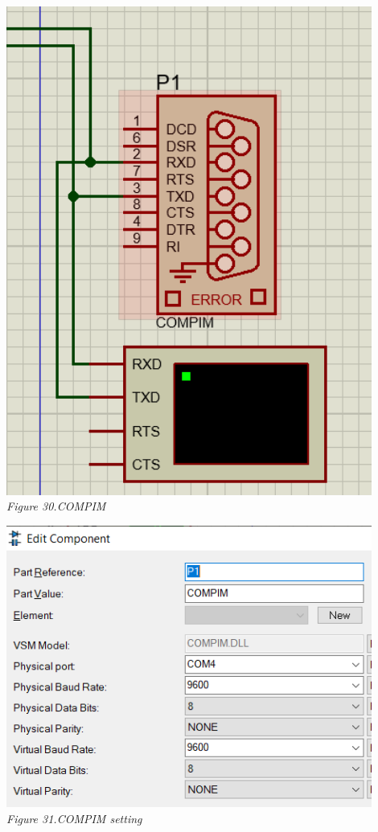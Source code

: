 \documentclass[a4paper]{article}
\begin{document}
\begin{center}
    \includegraphics[width=12cm]{pictures/COMPIM.png}\\
    \textit{Figure 30.COMPIM}\\
\end{center}
\begin{center}
    \includegraphics[width=12cm]{pictures/COMPIMsetup.png}\\
    \textit{Figure 31.COMPIM setting}\\
\end{center}
\end{document}

